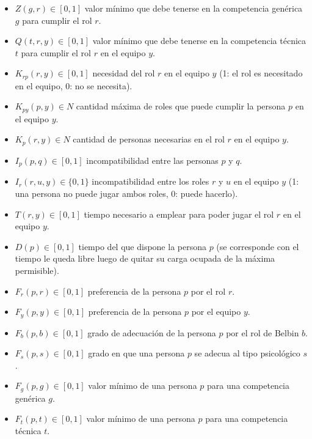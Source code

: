 \begin{itemize}
  \item $Z(g,r) \in [0,1]$ valor mínimo que debe tenerse en la competencia genérica $g$ para cumplir el rol $r$.
  
  \item $Q(t,r,y) \in [0,1]$ valor mínimo que debe tenerse en la competencia técnica $t$ para cumplir el rol $r$ en el equipo $y$.
  
  \item $K_{rp}(r, y) \in [0,1]$ necesidad del rol $r$ en el equipo $y$ (1: el rol es necesitado en el equipo, 0: no se necesita).
  
  \item $K_{py}(p,y) \in N$ cantidad máxima de roles que puede cumplir la persona $p$ en el equipo $y$.
  
  \item $K_{p}(r, y) \in N$ cantidad de personas necesarias en el rol $r$ en el equipo $y$.
  \item $I_p(p,q) \in [0,1]$ incompatibilidad entre las personas $p$ y $q$.
  
  \item $I_r(r,u,y) \in \{0,1\}$ incompatibilidad entre los roles $r$ y $u$ en el equipo $y$ (1: una persona no puede jugar ambos roles, 0: puede hacerlo).
  
  \item $T(r,y) \in [0,1]$ tiempo necesario a emplear para poder jugar el rol $r$ en el equipo $y$.
  
  \item $D(p) \in [0,1]$ tiempo del que dispone la persona $p$ (se corresponde con el tiempo le queda libre luego de quitar su carga ocupada de la máxima permisible).

  
  \item $F_r(p,r) \in [0,1]$ preferencia de la persona $p$ por el rol $r$.
  
  \item $F_y(p,y) \in [0,1]$ preferencia de la persona $p$ por el equipo $y$.
  
  \item $F_b(p,b) \in [0,1]$ grado de adecuación de la persona $p$ por el rol de Belbin $b$.
  
  \item $F_s(p,s) \in [0,1]$ grado en que una persona $p$ se adecua al tipo psicológico $s$.
  
  \item $F_g(p,g) \in [0,1]$ valor mínimo de una persona $p$ para una competencia genérica $g$.
  
  \item $F_t(p,t) \in [0,1]$ valor mínimo de una persona $p$ para una competencia técnica $t$.
\end{itemize}

